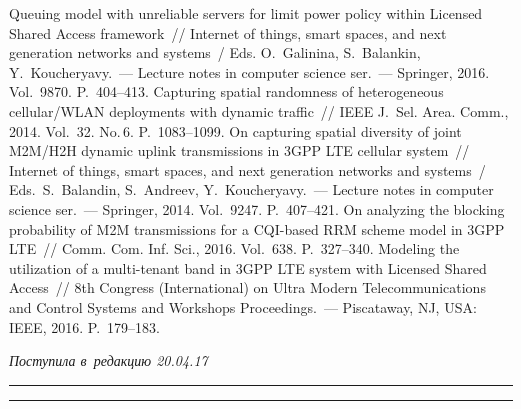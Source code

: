 \begin{multicols}{2}
{{\begin{thebibliography}{99}
 Queuing model with unreliable servers 
for limit power policy within Licensed Shared Access framework~// Internet of things, smart
spaces, and next generation networks and systems~/
Eds. O.~Galinina, S.~Balankin, Y.~Koucheryavy.~---
Lecture notes in computer 
science ser.~--- Springer, 2016. Vol.~9870. P.~404--413.
 Capturing spatial randomness of heterogeneous cellular/WLAN deployments with 
dynamic traffic~// IEEE J.~Sel. Area. Comm., 2014. Vol.~32.  
No.\,6. P.~1083--1099.
 On capturing 
spatial diversity of joint M2M/H2H dynamic uplink transmissions in 
3GPP LTE cellular system~// Internet of things, smart
spaces, and next generation networks and systems~/
Eds.\ S.~Balandin, S.~Andreev, Y.~Koucheryavy.~---
Lecture notes in computer science ser.~--- Springer, 2014. Vol.~9247. P.~407--421.
 On analyzing the blocking probability 
of M2M transmissions for a CQI-based RRM scheme model in 3GPP LTE~// Comm. 
Com. Inf. Sci., 2016. Vol.~638. P.~327--340.
 Modeling the utilization of a multi-tenant band in 3GPP LTE system with 
Licensed Shared Access~// 8th Congress (International) on Ultra Modern Telecommunications and 
Control Systems and Workshops Proceedings.~--- Piscataway, NJ, USA: IEEE, 
2016. P.~179--183.
 \end{thebibliography}

 }
 }

\end{multicols}

\vspace*{-6pt}

\hfill{\small\textit{Поступила в~редакцию 20.04.17}}

\vspace*{6pt}



\hrule

\vspace*{2pt}

\hrule

\vspace*{-4pt}


